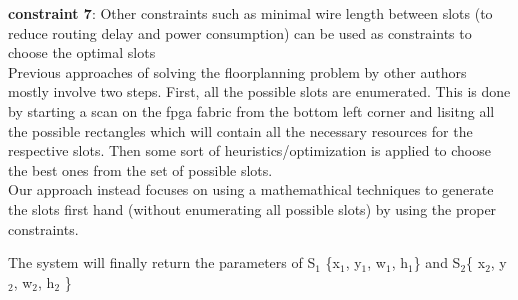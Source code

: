 \documentclass[11pt]{article}
\theoremstyle{definition}
\begin{document}
\textbf{constraint 7}: Other constraints such as minimal wire length between slots (to reduce routing delay and power consumption) can be used as constraints to choose the optimal slots \\
 
Previous approaches of solving the floorplanning problem by other authors mostly involve two steps. First, all the possible slots are enumerated. This is done by starting a scan on the fpga fabric from the bottom left corner and lisitng all the possible rectangles which will contain all the necessary resources for the respective slots. Then some sort of heuristics/optimization is applied to choose the best ones from the set of possible slots.\\
Our approach instead focuses on using a mathemathical techniques to generate the slots first hand (without enumerating all possible slots) by using the proper constraints. 


The system will finally return the parameters of S$_1$ \{x$_1$, y$_1$, w$_1$, h$_1$\} and S$_2$\{ x$_2$, y$_2$, w$_2$, h$_2$ \} \\
\end{document}
